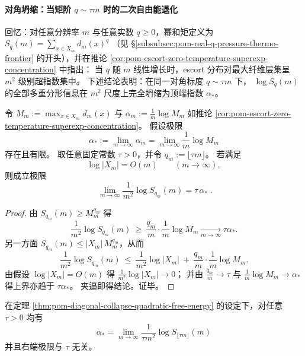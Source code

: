 
\paragraph{对角坍缩：当矩阶 \(q\sim \tau m\) 时的二次自由能退化}
回忆：对任意分辨率 \(m\) 与任意实数 \(q\ge 0\)，幂和矩定义为
\(
S_q(m)=\sum_{x\in X_m} d_m(x)^q
\)
（见 \S\ref{subsubsec:pom-real-q-pressure-thermo-frontier} 的开头），并在推论 \ref{cor:pom-escort-zero-temperature-superexp-concentration} 中指出：
当 \(q\) 随 \(m\) 线性增长时，escort 分布对最大纤维层集呈 \(m^2\) 级别超指数集中。
下述结论表明：在同一对角标度 \(q\sim \tau m\) 下，
\(\log S_q(m)\) 的全部多重分形信息在 \(m^2\) 尺度上完全坍缩为顶端指数 \(\alpha_\ast\)。

\begin{theorem}[对角坍缩二次自由能律]\label{thm:pom-diagonal-collapse-quadratic-free-energy}
令
\(
M_m:=\max_{x\in X_m}d_m(x)
\)
与
\(
\alpha_m:=\frac{1}{m}\log M_m
\)
如推论 \ref{cor:pom-escort-zero-temperature-superexp-concentration}。
假设极限
\[
\alpha_\ast:=\lim_{m\to\infty}\alpha_m=\lim_{m\to\infty}\frac{1}{m}\log M_m
\]
存在且有限。
取任意固定常数 \(\tau>0\)，并令 \(q_m:=\lfloor\tau m\rfloor\)。
若满足
\[
\log|X_m|=O(m)\qquad(m\to\infty),
\]
则成立极限
\[
\boxed{\;
\lim_{m\to\infty}\frac{1}{m^2}\log S_{q_m}(m)=\tau\,\alpha_\ast\; }.
\]
\end{theorem}
\begin{proof}
由 \(S_{q_m}(m)\ge M_m^{q_m}\) 得
\[
\frac{1}{m^2}\log S_{q_m}(m)\ \ge\ \frac{q_m}{m}\cdot \frac{1}{m}\log M_m
\xrightarrow[m\to\infty]{}\tau\alpha_\ast.
\]
另一方面 \(S_{q_m}(m)\le |X_m|\,M_m^{q_m}\)，从而
\[
\frac{1}{m^2}\log S_{q_m}(m)
\ \le\
\frac{1}{m^2}\log|X_m|
\ +\
\frac{q_m}{m}\cdot\frac{1}{m}\log M_m.
\]
由假设 \(\log|X_m|=O(m)\) 得 \(\frac{1}{m^2}\log|X_m|\to 0\)；
并由 \(\frac{q_m}{m}\to\tau\) 与 \(\frac{1}{m}\log M_m\to\alpha_\ast\) 得上界亦趋于 \(\tau\alpha_\ast\)。
夹逼即得结论。证毕。
\end{proof}

\begin{corollary}\label{cor:pom-diagonal-extract-alpha-star}
在定理 \ref{thm:pom-diagonal-collapse-quadratic-free-energy} 的设定下，对任意 \(\tau>0\) 均有
\[
\boxed{\;
\alpha_\ast=\lim_{m\to\infty}\frac{1}{\tau m^2}\log S_{\lfloor\tau m\rfloor}(m)\;}
\]
并且右端极限与 \(\tau\) 无关。
\end{corollary}


